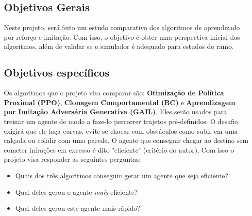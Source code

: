 \subsection*{Objetivos Gerais}
Neste projeto, será feito um estudo comparativo dos algoritmos de aprendizado por reforço e imitação. Com isso, o objetivo é obter uma perspectiva inicial dos algoritmos, além de validar se o simulador é adequado para estudos do ramo.

\subsection*{Objetivos específicos}
Os algoritmos que o projeto visa comparar são: \textbf{Otimização de Política Proximal (PPO)}, \textbf{Clonagem Comportamental (BC)} e \textbf{Aprendizagem por Imitação Adversária Generativa (GAIL)}. Eles serão usados para treinar um agente de modo a faze-lo percorrer trajetos pré-definidos. O desafio exigirá que ele faça curvas, evite se chocar com obstáculos como subir em uma calçada ou colidir com uma parede. O agente que conseguir chegar ao destino sem cometer infrações em excesso é dito "eficiente" (critério do autor). Com isso o projeto visa responder as seguintes perguntas:

\begin{itemize}
    \item Quais dos três algoritmos conseguiu gerar um agente que seja eficiente?
    \item Qual deles gerou o agente \textit{mais} eficiente?
    \item Qual deles gerou este agente mais rápido?
\end{itemize}

